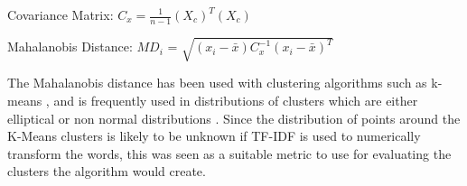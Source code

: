 \begin{center}
	Covariance Matrix:
	\boldmath$C_{x} = \frac{1}{n - 1} (X_{c}) ^T (X_{c})$
	
	Mahalanobis Distance:
	\unboldmath$MD_{i}$ = \boldmath$\sqrt{(x_{i}  -  \bar{ x  } ) C_{x}^{-1} ( x_{i}   - \bar{ x  }  )^T    }  $
\end{center}

The Mahalanobis distance has been used with clustering algorithms such as k-means \cite{melnykov2014k} \cite{cerioli2005k}, and is frequently used in distributions of clusters which are either elliptical \cite{mitchell1985mahalanobis} or non normal distributions \cite{warren2011use}. Since the distribution of points around the K-Means clusters is likely to be unknown if TF-IDF is used to numerically transform the words, this was seen as a suitable metric to use for evaluating the clusters the algorithm would create.